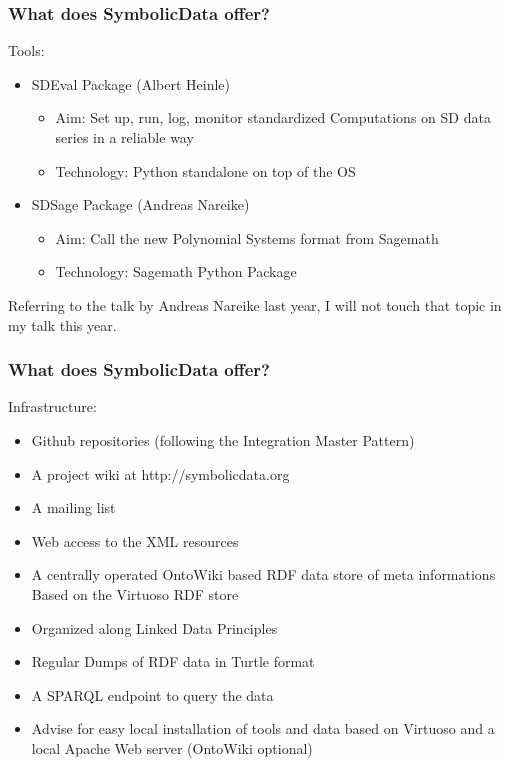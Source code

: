 \documentclass{beamer}
\begin{document}
\begin{frame}\frametitle{What does SymbolicData offer?}
{Tools:}
\begin{itemize}
\item SDEval Package (Albert Heinle)
\begin{itemize}
\item Aim: Set up, run, log, monitor standardized Computations on SD data
  series in a reliable way 
\item Technology: Python standalone on top of the OS
\end{itemize}
\item SDSage Package (Andreas Nareike)
\begin{itemize}
\item Aim: Call the new Polynomial Systems format from Sagemath 
\item Technology: Sagemath Python Package
\end{itemize}
\end{itemize}
Referring to the talk by Andreas Nareike last year, I will not touch that
topic in my talk this year.
\end{frame}

\begin{frame}\frametitle{What does SymbolicData offer?}
{Infrastructure:}
\begin{itemize}
\item Github repositories (following the Integration Master Pattern)
\item A project wiki at http://symbolicdata.org
\item A mailing list
\item Web access to the XML resources
\item A centrally operated OntoWiki based RDF data store of meta informations
  Based on the Virtuoso RDF store
\item Organized along Linked Data Principles
\item Regular Dumps of RDF data in Turtle format
\item A SPARQL endpoint to query the data
\item Advise for easy local installation of tools and data based on Virtuoso
  and a local Apache Web server (OntoWiki optional)
\end{itemize}
\end{frame}
\end{document}
